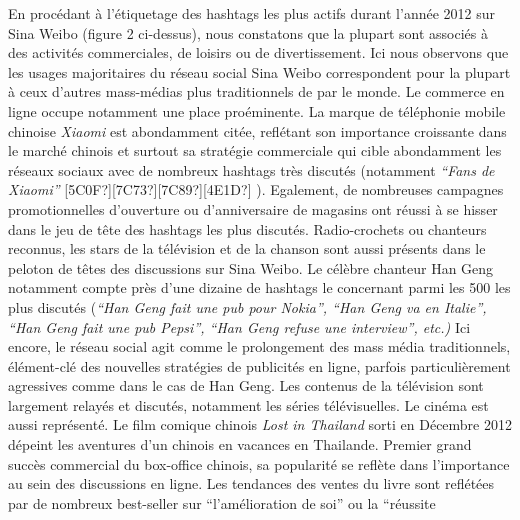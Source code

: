 En proc\'edant \`a l{\textquoteright}\'etiquetage des hashtags les plus
actifs durant l{\textquoteright}ann\'ee 2012 sur Sina Weibo (figure 2
ci-dessus), nous constatons que la plupart sont associ\'es \`a des
activit\'es commerciales, de loisirs ou de divertissement. Ici nous
observons que les usages majoritaires du r\'eseau social Sina Weibo
correspondent pour la plupart \`a ceux d{\textquoteright}autres
mass-m\'edias plus traditionnels de par le monde. Le commerce en ligne
occupe notamment une place pro\'eminente. La marque de t\'el\'ephonie
mobile chinoise \textit{Xiaomi }est abondamment cit\'ee, refl\'etant
son importance croissante dans le march\'e chinois et surtout sa
strat\'egie commerciale qui cible abondamment les r\'eseaux sociaux
avec de nombreux hashtags tr\`es discut\'es (notamment
\textit{{\textquotedblleft}Fans de Xiaomi{\textquotedblright}
}[5C0F?][7C73?][7C89?][4E1D?] ). Egalement, de nombreuses campagnes
promotionnelles d{\textquoteright}ouverture ou
d{\textquoteright}anniversaire de magasins ont r\'eussi \`a se hisser
dans le jeu de t\^ete des hashtags les plus discut\'es. Radio-crochets
ou chanteurs reconnus, les stars de la t\'el\'evision et de la chanson
sont aussi pr\'esents dans le peloton de t\^etes des discussions sur
Sina Weibo. Le c\'el\`ebre chanteur Han Geng notamment compte pr\`es
d{\textquoteright}une dizaine de hashtags le concernant parmi les 500
les plus discut\'es (\textit{{\textquotedblleft}Han Geng fait une pub
pour Nokia{\textquotedblright}, {\textquotedblleft}Han Geng va en
Italie{\textquotedblright}, {\textquotedblleft}Han Geng fait une pub
Pepsi{\textquotedblright}, {\textquotedblleft}Han Geng refuse une
interview{\textquotedblright}, etc.)} Ici encore, le r\'eseau social
agit comme le prolongement des mass m\'edia traditionnels,
\'el\'ement-cl\'e des nouvelles strat\'egies de publicit\'es en ligne,
parfois particuli\`erement agressives comme dans le cas de Han Geng.
Les contenus de la t\'el\'evision sont largement relay\'es et
discut\'es, notamment les s\'eries t\'el\'evisuelles. Le cin\'ema est
aussi repr\'esent\'e. Le film comique chinois \textit{Lost in Thailand
}sorti en D\'ecembre 2012 d\'epeint les aventures d{\textquoteright}un
chinois en vacances en Thailande. Premier grand succ\`es commercial du
box-office chinois, sa popularit\'e se refl\`ete dans
l{\textquoteright}importance au sein des discussions en ligne. Les
tendances des ventes du livre sont refl\'et\'ees par de nombreux
best-seller sur {\textquotedblleft}l{\textquoteright}am\'elioration de
soi{\textquotedblright} ou la {\textquotedblleft}r\'eussite
